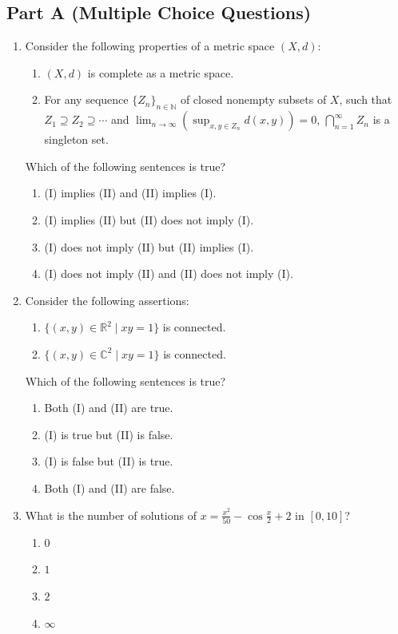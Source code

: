 \documentclass[11pt, a4paper]{article}
\begin{document}
\subsection*{Part A (Multiple Choice Questions)}
\begin{enumerate}
  \item Consider the following properties of a metric space $(X, d)$:
  \begin{enumerate}[label=(\Roman*)]
    \item $(X, d)$ is complete as a metric space.
    \item For any sequence $\{Z_n\}_{n \in \mathbb{N}}$ of closed nonempty subsets of $X$, such that $Z_1 \supseteq Z_2 \supseteq \cdots$ and $\lim_{n \to \infty} (\sup_{x, y \in Z_n} d(x, y)) = 0$, $\bigcap_{n=1}^\infty Z_n$ is a singleton set.
  \end{enumerate}
  Which of the following sentences is true?
  \begin{enumerate}[label=(\alph*)]
    \item (I) implies (II) and (II) implies (I).
    \item (I) implies (II) but (II) does not imply (I).
    \item (I) does not imply (II) but (II) implies (I).
    \item (I) does not imply (II) and (II) does not imply (I).
  \end{enumerate}

  \item Consider the following assertions:
  \begin{enumerate}[label=(\Roman*)]
    \item $\{(x, y) \in \mathbb{R}^2 \mid xy = 1\}$ is connected.
    \item $\{(x, y) \in \mathbb{C}^2 \mid xy = 1\}$ is connected.
  \end{enumerate}
  Which of the following sentences is true?
  \begin{enumerate}[label=(\alph*)]
    \item Both (I) and (II) are true.
    \item (I) is true but (II) is false.
    \item (I) is false but (II) is true.
    \item Both (I) and (II) are false.
  \end{enumerate}

  \item What is the number of solutions of $x = \frac{x^2}{50} - \cos\frac{x}{2} + 2$ in $[0, 10]$?
  \begin{enumerate}[label=(\alph*)]
    \item $0$
    \item $1$
    \item $2$
    \item $\infty$
  \end{enumerate}


\end{enumerate}
\end{document}
